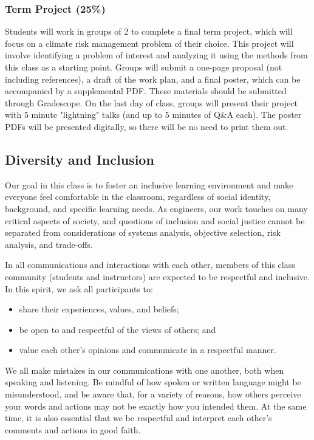 \documentclass[12pt,a4paper]{article}
\begin{document}
\subsubsection{Term Project (25\%)}
Students will work in groups of 2 to complete a final term project, which will focus on a climate risk management problem of their choice. This project will involve identifying a problem of interest and analyzing it using the methods from this class as a starting point. Groups will submit a one-page proposal (not including references), a draft of the work plan, and a final poster, which can be accompanied by a supplemental PDF. These materials should be submitted through Gradescope. On the last day of class, groups will present their project with 5 minute "lightning" talks (and up to 5 minutes of Q\&A each). The poster PDFs will be presented digitally, so there will be no need to print them out.

\subsection{Diversity and Inclusion}
Our goal in this class is to foster an inclusive learning environment and make everyone feel comfortable in the classroom, regardless of social identity, background, and specific learning needs. As engineers, our work touches on many critical aspects of society, and questions of inclusion and social justice cannot be separated from considerations of systems analysis, objective selection, risk analysis, and trade-offs. 

In all communications and interactions with each other, members of this class community (students and instructors) are expected to be respectful and inclusive. In this spirit, we ask all participants to:

\begin{itemize}
\item share their experiences, values, and beliefs;


\item be open to and respectful of the views of others; and


\item value each other's opinions and communicate in a respectful manner.

\end{itemize}
We all make mistakes in our communications with one another, both when speaking and listening. Be mindful of how spoken or written language might be misunderstood, and be aware that, for a variety of reasons, how others perceive your words and actions may not be exactly how you intended them. At the same time, it is also essential that we be respectful and interpret each other's comments and actions in good faith. 
\end{document}
